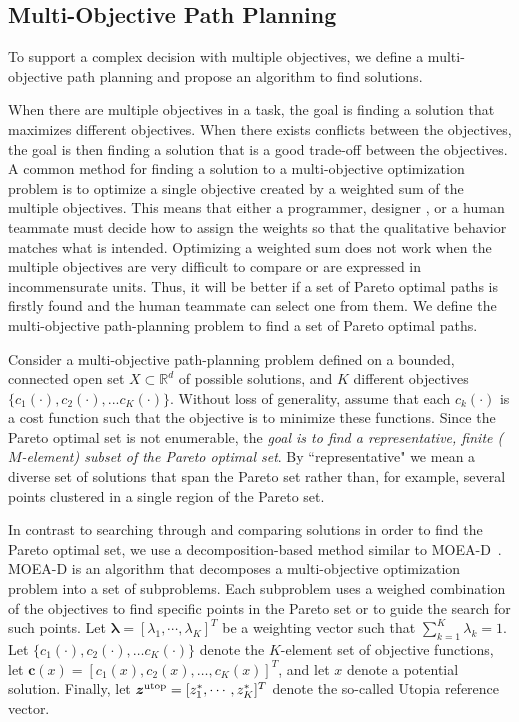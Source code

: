 \documentclass[phd]{byuprop}
\begin{document}
\subsection{Multi-Objective Path Planning}
\label{sec:project_description:multi_objective_path_planning}

To support a complex decision with multiple objectives, we define a multi-objective path planning and propose an algorithm to find solutions.

When there are multiple objectives in a task, the goal is finding a solution that maximizes different objectives.
When there exists conflicts between the objectives, the goal is then finding a solution that is a good trade-off between the objectives.
A common method for finding a solution to a multi-objective optimization problem is to optimize a single objective created by a weighted sum of the multiple objectives.
This means that either a programmer, designer , or a human teammate must decide how to assign the weights so that the qualitative behavior matches what is intended. 
Optimizing a weighted sum does not work when the multiple objectives are very difficult to compare or are expressed in incommensurate units.
Thus, it will be better if a set of Pareto optimal paths is firstly found and the human teammate can select one from them.
We define the multi-objective path-planning problem to find a set of Pareto optimal paths.

Consider a multi-objective path-planning problem defined on a bounded, connected open set $X\subset\mathbb{R}^d$ of possible solutions, and $K$ different objectives $\{c_{1}(\cdot), c_{2}(\cdot), ... c_{K}(\cdot)\}$. 
Without loss of generality, assume that each $c_{k}(\cdot)$ is a cost function such that the objective is to minimize these functions.  
Since the Pareto optimal set is not enumerable, the {\em goal is to find a representative, finite ($M$-element) subset of the Pareto optimal set}.  
By ``representative" we mean a diverse set of solutions that span the Pareto set rather than, for example, several points clustered in a single region of the Pareto set.

In contrast to searching through and comparing solutions in order to find the Pareto optimal set, we use a decomposition-based method similar to MOEA-D~\cite{Zhang2007}.  
MOEA-D is an algorithm that decomposes a multi-objective optimization problem into a set of subproblems.  
Each subproblem uses a weighed combination of the objectives to find specific points in the Pareto set or to guide the search for such points.  
Let $ \bm{\lambda} = [ \lambda_{1} , \cdots , \lambda_{K}  ]^{T} $ be a weighting vector such that $ \sum_{k=1}^{K} \lambda_{k} = 1 $.  
Let $\{c_{1}(\cdot), c_{2}(\cdot), \ldots c_{K}(\cdot)\}$ denote the $K$-element set of objective functions, let $\bm{c}(x) = [c_{1}(x), c_{2}(x), \ldots, c_{K}(x)]^T$, and let $x$ denote a potential solution.  
Finally, let $ \bm{z}^{\rm utop} = [z^{*}_{1}, \cdots , z^{*}_{K}]^{T} $ denote the so-called Utopia reference vector. %
\end{document}
